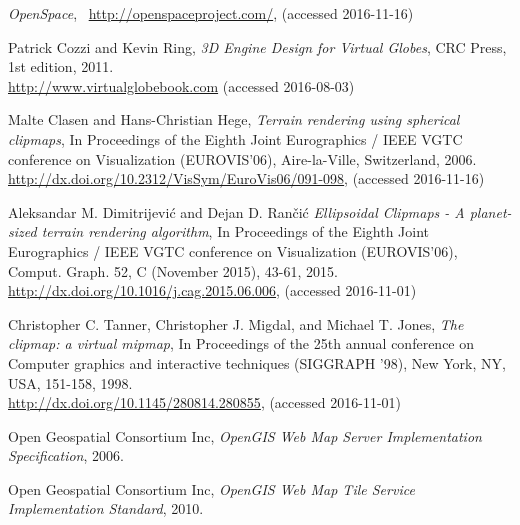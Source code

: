 \cleardoublepage
{}
{}
\begin{thebibliography}{99}



  \emph{OpenSpace},
   \
  \url{http://openspaceproject.com/},
  (accessed 2016-11-16)

  Patrick Cozzi and Kevin Ring,
  \emph{3D Engine Design for Virtual Globes},
  CRC Press,
  1st edition,
  2011. \\
  \url{http://www.virtualglobebook.com}
  (accessed 2016-08-03)

  Malte Clasen and Hans-Christian Hege,
  \emph{Terrain rendering using spherical clipmaps},
  In Proceedings of the Eighth Joint Eurographics / IEEE VGTC conference on Visualization (EUROVIS'06),
  Aire-la-Ville, Switzerland,
  2006. \\
  \url{http://dx.doi.org/10.2312/VisSym/EuroVis06/091-098},
  (accessed 2016-11-16)

  Aleksandar M. Dimitrijevi\'{c} and Dejan D. Ran\v{c}i\'{c}
  \emph{Ellipsoidal Clipmaps - A planet-sized terrain rendering algorithm},
  In Proceedings of the Eighth Joint Eurographics / IEEE VGTC conference on Visualization (EUROVIS'06),
  Comput. Graph. 52, C (November 2015), 43-61,
  2015. \\
  \url{http://dx.doi.org/10.1016/j.cag.2015.06.006},
  (accessed 2016-11-01)

  Christopher C. Tanner, Christopher J. Migdal, and Michael T. Jones,
  \emph{The clipmap: a virtual mipmap},
  In Proceedings of the 25th annual conference on Computer graphics and interactive techniques (SIGGRAPH '98),
  New York, NY, USA, 151-158,
  1998. \\
  \url{http://dx.doi.org/10.1145/280814.280855},
  (accessed 2016-11-01)

  Open Geospatial Consortium Inc,
  \emph{OpenGIS Web Map Server Implementation Specification},
  2006.

  Open Geospatial Consortium Inc,
  \emph{OpenGIS Web Map Tile Service Implementation Standard},
  2010.


\end{thebibliography}
